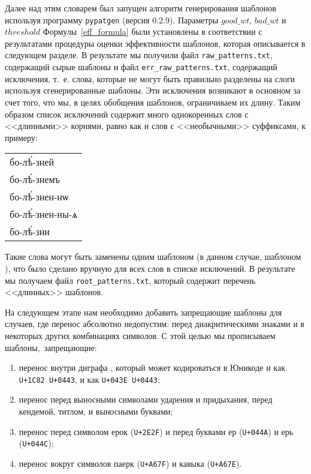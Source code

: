 \documentclass[12pt,a4paper,oneside]{extarticle}
\begin{document}
Далее над этим словарем был запущен алгоритм генерирования шаблонов используя программу \verb+pypatgen+ (версия 0.2.9). Параметры $good\_wt$, $bad\_wt$ и $threshold$ Формулы~\ref{eff_formula} были установлены в соответствии с результатами процедуры оценки эффективности шаблонов, которая описывается в следующем разделе. В результате мы получили файл \verb+raw_patterns.txt+, содержащий сырые шаблоны и файл \verb+err_raw_patterns.txt+, содержащий исключения, т.~е. слова, которые не могут быть правильно разделены на слоги используя сгенерированные шаблоны. Эти исключения возникают в основном за счет того, что мы, в целях обобщения шаблонов, ограничиваем их длину. Таким образом список исключений содержит много однокоренных слов с <<длинными>> корнями, равно как и слов с <<необычными>> суффиксами, к примеру:

\begin{center}
\begin{churchslavonic}
\begin{tabular}{l}
бо-лѣ́-зней \\
бо-лѣ́-знемъ \\
бо-лѣ́-знен-нѡ \\
бо-лѣ́-знен-ны-ѧ \\
бо-лѣ́-зни \\
\end{tabular}
\end{churchslavonic}
\end{center}

\noindent Такие слова могут быть заменены одним шаблоном (в данном случае, шаблоном ), что было сделано вручную для всех слов в списке исключений. В результате мы получаем файл \verb+root_patterns.txt+, который содержит перечень <<длинных>> шаблонов.

На следующем этапе нам необходимо добавить запрещающие шаблоны для случаев, где перенос абсолютно недопустим: перед диакритическими знаками и в некоторых других комбинациях символов. С этой целью мы прописываем шаблоны, запрещающие:

\begin{enumerate}
\item перенос внутри диграфа , который может кодироваться в Юникоде и как \verb!U+1C82 U+0443!, и как \verb!U+043E U+0443!;
\item перенос перед выносными символами ударения и придыхания, перед кендемой, титлом, и выносными буквами\autocite[Полный перечень символов вместе с их кодовыми точками в Юникоде, а также полный перечень возможных слов с титлом или буквенными титлами см. ][]{utn41};
\item перенос перед символом ерок (\verb!U+2E2F!) и перед буквами ер (\verb!U+044A!) и ерь (\verb!U+044C!);
\item перенос вокруг символов паерк (\verb!U+A67F!) и кавыка (\verb!U+A67E!).
\end{enumerate}
\end{document}
